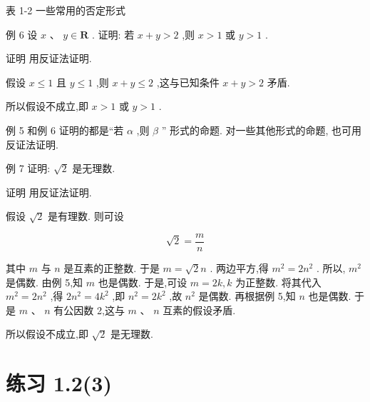 \documentclass[10pt]{article}
\begin{document}
表 1-2 一些常用的否定形式

\begin{center}
\end{center}

例 6 设 \(x\text{ 、 }y \in  \mathbf{R}\) . 证明: 若 \(x + y > 2\) ,则 \(x > 1\) 或 \(y > 1\) .

证明 用反证法证明.

假设 \(x \leq  1\) 且 \(y \leq  1\) ,则 \(x + y \leq  2\) ,这与已知条件 \(x + y > 2\) 矛盾.

所以假设不成立,即 \(x > 1\) 或 \(y > 1\) .

例 5 和例 6 证明的都是“若 \(\alpha\) ,则 \(\beta\) ” 形式的命题. 对一些其他形式的命题, 也可用反证法证明.

例 7 证明: \(\sqrt{2}\) 是无理数.

证明 用反证法证明.

假设 \(\sqrt{2}\) 是有理数. 则可设

\[
\sqrt{2} = \frac{m}{n}
\]

其中 \(m\) 与 \(n\) 是互素的正整数. 于是 \(m = \sqrt{2}n\) . 两边平方,得 \({m}^{2} = 2{n}^{2}\) . 所以, \({m}^{2}\) 是偶数. 由例 5,知 \(m\) 也是偶数. 于是,可设 \(m = {2k},k\) 为正整数. 将其代入 \({m}^{2} = 2{n}^{2}\) ,得 \(2{n}^{2} = 4{k}^{2}\) ,即 \({n}^{2} = 2{k}^{2}\) ,故 \({n}^{2}\) 是偶数. 再根据例 5,知 \(n\) 也是偶数. 于是 \(m\text{ 、 }n\) 有公因数 2,这与 \(m\text{ 、 }n\) 互素的假设矛盾.

所以假设不成立,即 \(\sqrt{2}\) 是无理数.

\section*{练习 1.2(3)}
\end{document}
